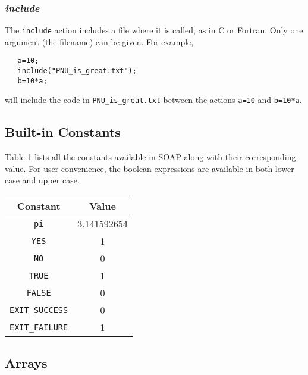 \documentclass{warpdoc}
\newcommand{\tablespacing}{\vspace{-0.4cm}}
\renewcommand{\fontsizetable}{\footnotesize\scalefont{1.0}}
\begin{document}
\subsubsection{\emph{include}}

The \verb|include| action includes a file where it is called, as in
C or Fortran. Only one argument (the filename) can be given. For example,
%
\begin{verbatim}
   a=10;
   include("PNU_is_great.txt");
   b=10*a;
\end{verbatim}
%
will include the code in \verb|PNU_is_great.txt|
between the actions \verb|a=10| and \verb|b=10*a|.


\subsection{Built-in Constants}

Table \ref{table:constants} lists all the constants available in SOAP
along with their corresponding value.
For user convenience, the boolean expressions are available in
both lower case and upper case.

\begin{table}[ht]
\fontsizetable
\vspace{0.3cm}
\begin{center}
  \begin{threeparttable}
    \begin{tabular}{cc}
      \toprule
        Constant & Value \\
       \midrule
        \verb|pi| & 3.141592654\\
        \verb|YES| & 1\\
        \verb|NO| & 0\\
        \verb|TRUE| & 1\\
        \verb|FALSE| & 0\\
        \verb|EXIT_SUCCESS| &0\\
        \verb|EXIT_FAILURE| &1   \\
      \bottomrule
    \end{tabular}
    \label{table:constants}
  \end{threeparttable}
\end{center}
\tablespacing
\end{table}
%




\subsection{Arrays}
\end{document}

